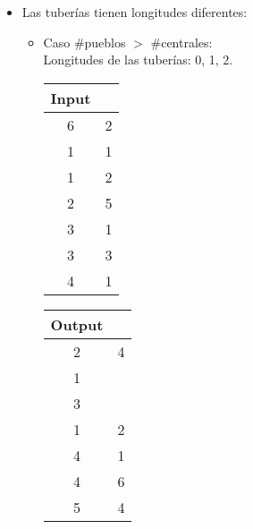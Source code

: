 \documentclass[11pt, a4paper, twoside]{article}
\begin{document}
\begin{itemize}
	\item Las tuber\'ias tienen longitudes diferentes: 
		    \begin{itemize}
				\item Caso \#pueblos $>$ \#centrales: \\
				   Longitudes de las tuber\'ias: 0, 1, 2. \\
				   \begin{minipage}{0.2\textwidth}
						\begin{tabular}{cc}
							   Input \\
							   \hline
							   6 & 2 \\
							   1 & 1 \\
							   1 & 2 \\
							   2 & 5 \\
							   3 & 1 \\
							   3 & 3 \\
							   4 & 1 \\
						\end{tabular}
					\end{minipage} 
					\begin{minipage}{0.2\textwidth}
						\begin{tabular}{cc}
						   Output \\
						   \hline
						   2 & 4 \\
						   1 &  \\
						   3 &  \\
						   1 & 2 \\
						   4 & 1 \\
						   4 & 6 \\
						   5 & 4 \\
						\end{tabular}
				   \end{minipage}  \\
			

\end{itemize}
\end{itemize}
\end{document}
